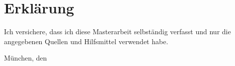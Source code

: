 \chapter*{Erklärung}
Ich versichere, dass ich diese Masterarbeit selbständig verfasst und nur die angegebenen Quellen und Hilfsmittel verwendet habe.

\vspace{4\baselineskip}

\makeatletter
München, den \@date
\makeatother
